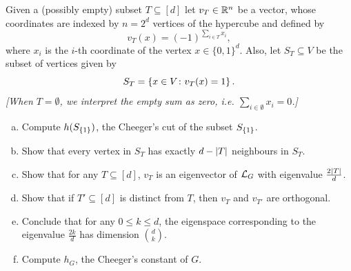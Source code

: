 \begin{myexercise}
    Given a (possibly empty) subset $T \subseteq [d]$ let $v_T \in \mathbb{R}^n$ be a vector, whose coordinates are indexed by $n=2^d$ vertices of the hypercube and defined by
    \begin{equation*}
        v_T(x) = (-1)^{\sum_{i \in T} x_i},
    \end{equation*}
    where $x_i$ is the $i$-th coordinate of the vertex $x\in\{0,1\}^d$.
    Also, let $S_T \subseteq V$ be the subset of vertices given by
    \begin{equation*}
        S_T = \left\{ x \in V \colon v_T(x) = 1 \right\}.
    \end{equation*}
    \textit{[When $T = \emptyset$, we interpret the empty sum as zero, i.e. $\sum_{i \in \emptyset}x_i = 0$.]}
    
    \begin{enumerate}[(a)]
        \item Compute $h(S_{\left\{ 1 \right\}})$, the Cheeger's cut of the subset $S_{\left\{ 1 \right\}}$.

        \item Show that every vertex in $S_T$ has exactly $d-|T|$ neighbours in $S_T$.
        
        \item Show that for any $T \subseteq [d]$, $v_T$ is an eigenvector of $\mathcal{L}_G$ with eigenvalue $\frac{2|T|}{d}$.
        
        \item Show that if $T' \subseteq [d]$ is distinct from $T$, then $v_T$ and $v_{T'}$ are orthogonal.

        \item Conclude that for any $0 \leq k \leq d$, the eigenspace corresponding to the eigenvalue $\frac{2k}{d}$ has dimension ${d \choose k}$.

        \item Compute $h_G$, the Cheeger’s constant of $G$.
    \end{enumerate}
\end{myexercise}

